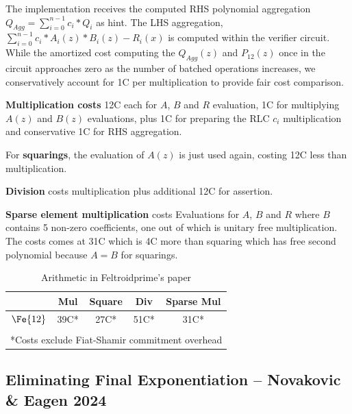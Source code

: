 

The implementation receives the computed RHS polynomial aggregation $Q_{Agg} = \sum_{i=0}^{n-1}{c_i*Q_i}$ as hint. The LHS aggregation, $\sum_{i=0}^{n-1}{c_i*A_i(z)*B_i(z) - R_i(x)}$ is computed within the verifier circuit. While the amortized cost computing the $Q_{Agg}(z)$ and $P_{12}(z)$ once in the circuit approaches zero as the number of batched operations increases, we conservatively account for 1C per multiplication to provide fair cost comparison.

\textbf{Multiplication costs} 12C each for $A$, $B$ and $R$ evaluation, 1C for multiplying $A(z)$ and $B(z)$ evaluations, plus 1C for preparing the RLC $c_i$ multiplication and conservative 1C for RHS aggregation.

For \textbf{squarings}, the evaluation of $A(z)$ is just used again, costing 12C less than multiplication.

\textbf{Division} costs multiplication plus additional 12C for assertion.

\textbf{Sparse element multiplication} costs Evaluations for $A$, $B$ and $R$ where $B$ contains 5 non-zero coefficients, one out of which is unitary free multiplication. The costs comes at 31C which is 4C more than squaring which has free second polynomial because $A = B$ for squarings.

\begin{table}[h]
\centering
\caption{Arithmetic in Feltroidprime's paper\cite{FXFM23}}
\label{tab:fq12_fxfm}
\begin{tabular}{|c|c|c|c|c|}
\hline
 & Mul & Square & Div & Sparse Mul \\
\hline
$\Fe{12}$ & 39C* & 27C* & 51C* & 31C* \\
\hline
\multicolumn{5}{|c|}{} \\
\multicolumn{5}{|c|}{*Costs exclude Fiat-Shamir commitment overhead} \\
\hline
\end{tabular}
\end{table}

\subsection{Eliminating Final Exponentiation -- Novakovic \& Eagen 2024}

